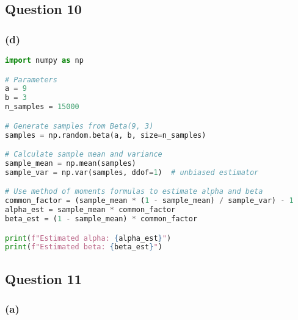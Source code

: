



\subsection{Question 10}

\subsubsection*{(d)}

\begin{lstlisting}[language=Python]
import numpy as np

# Parameters
a = 9
b = 3
n_samples = 15000

# Generate samples from Beta(9, 3)
samples = np.random.beta(a, b, size=n_samples)

# Calculate sample mean and variance
sample_mean = np.mean(samples)
sample_var = np.var(samples, ddof=1)  # unbiased estimator

# Use method of moments formulas to estimate alpha and beta
common_factor = (sample_mean * (1 - sample_mean) / sample_var) - 1
alpha_est = sample_mean * common_factor
beta_est = (1 - sample_mean) * common_factor

print(f"Estimated alpha: {alpha_est}")
print(f"Estimated beta: {beta_est}")
\end{lstlisting}




\newpage
\subsection{Question 11}

\subsubsection*{(a)}

